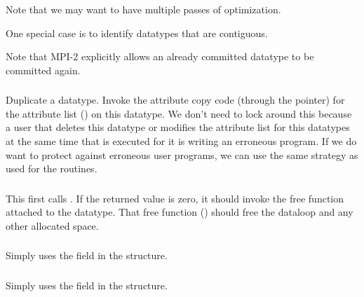 \documentclass{article}
\begin{document}
Note that we may want to have multiple passes of optimization.  


One special case is to identify datatypes that are contiguous.  

Note that MPI-2 explicitly allows an already committed datatype to be
committed again.


\subsubsection{}
Duplicate a datatype.  
Invoke the attribute copy code (through the
 pointer) for the attribute
list () on this datatype.
We don't need to lock around this because a user that deletes this datatype
or modifies the attribute list for this datatypes 
at the same time that  is executed for it is
writing an erroneous program.  If we do want to protect against
erroneous user programs, we can use the same strategy as used for the
 routines.

\subsubsection{}
This first calls .  If
the returned value is zero, it should invoke the free function
attached to the datatype.  That free function
() should free the dataloop
and any other allocated space.


\subsubsection{}
Simply uses the  field in the structure.

\subsubsection{}
Simply uses the  field in the structure.
\end{document}
